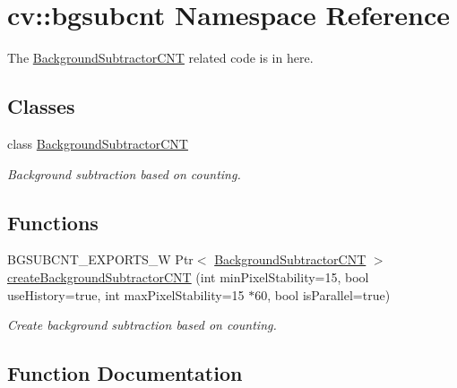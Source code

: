 \hypertarget{namespacecv_1_1bgsubcnt}{}\section{cv\+:\+:bgsubcnt Namespace Reference}
\label{namespacecv_1_1bgsubcnt}


The \hyperlink{classcv_1_1bgsubcnt_1_1BackgroundSubtractorCNT}{Background\+Subtractor\+C\+NT} related code is in here.  


\subsection*{Classes}
\begin{DoxyCompactItemize}
\item 
class \hyperlink{classcv_1_1bgsubcnt_1_1BackgroundSubtractorCNT}{Background\+Subtractor\+C\+NT}
\begin{DoxyCompactList}\small\item\em Background subtraction based on counting. \end{DoxyCompactList}\end{DoxyCompactItemize}
\subsection*{Functions}
\begin{DoxyCompactItemize}
\item 
B\+G\+S\+U\+B\+C\+N\+T\+\_\+\+E\+X\+P\+O\+R\+T\+S\+\_\+W Ptr$<$ \hyperlink{classcv_1_1bgsubcnt_1_1BackgroundSubtractorCNT}{Background\+Subtractor\+C\+NT} $>$ \hyperlink{namespacecv_1_1bgsubcnt_a6a6efd913954320be33f39c32a4c5a7e}{create\+Background\+Subtractor\+C\+NT} (int min\+Pixel\+Stability=15, bool use\+History=true, int max\+Pixel\+Stability=15 $\ast$60, bool is\+Parallel=true)
\begin{DoxyCompactList}\small\item\em Create background subtraction based on counting. \end{DoxyCompactList}\end{DoxyCompactItemize}


\subsection{Function Documentation}

